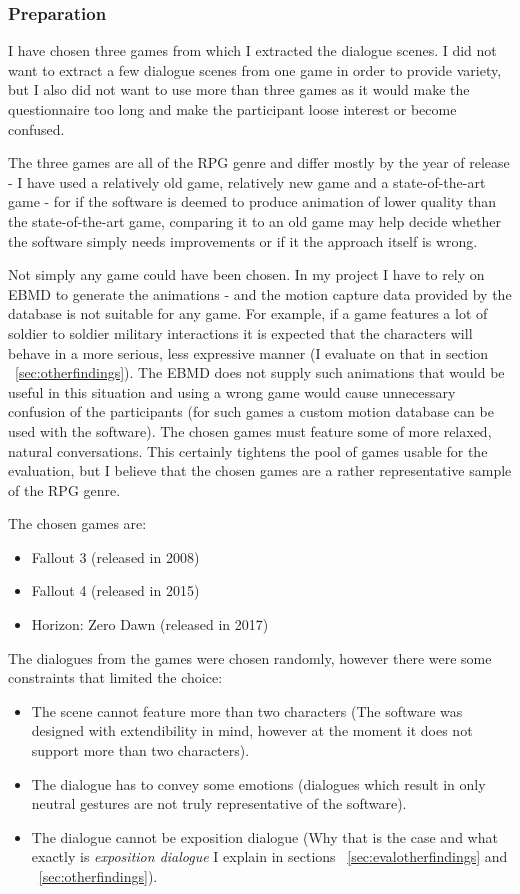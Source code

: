 \medskip
\subsubsection{Preparation}
I have chosen three games from which I extracted the dialogue scenes. I did not want to extract a few dialogue scenes from one game in order to provide variety, but I also did not want to use more than three games as it would make the questionnaire too long and make the participant loose interest or become confused.

The three games are all of the RPG genre and differ mostly by the year of release - I have used a relatively old game, relatively new game and a state-of-the-art game - for if the software is deemed to produce animation of lower quality than the state-of-the-art game, comparing it to an old game may help decide whether the software simply needs improvements or if it the approach itself is wrong.

Not simply any game could have been chosen. In my project I have to rely on EBMD to generate the animations - and the motion capture data provided by the database is not suitable for any game. For example, if a game features a lot of soldier to soldier military interactions it is expected that the characters will behave in a more serious, less expressive manner (I evaluate on that in section ~\ref{sec:otherfindings}). The EBMD does not supply such animations that would be useful in this situation and using a wrong game would cause unnecessary confusion of the participants (for such games a custom motion database can be used with the software). The chosen games must feature some of more relaxed, natural conversations. This certainly tightens the pool of games usable for the evaluation, but I believe that the chosen games are a rather representative sample of the RPG genre.

The chosen games are:
\begin{itemize}
	\item Fallout 3 (released in 2008)
	\item Fallout 4 (released in 2015)
	\item Horizon: Zero Dawn (released in 2017)
\end{itemize}

The dialogues from the games were chosen randomly, however there were some constraints that limited the choice:
\begin{itemize}
	\item The scene cannot feature more than two characters (The software was designed with extendibility in mind, however at the moment it does not support more than two characters).
	\item The dialogue has to convey some emotions (dialogues which result in only neutral gestures are not truly representative of the software).
	\item The dialogue cannot be exposition dialogue (Why that is the case and what exactly is \textit{exposition dialogue} I explain in sections ~\ref{sec:evalotherfindings} and ~\ref{sec:otherfindings}).
\end{itemize}



